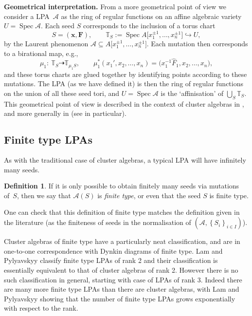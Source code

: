 \documentclass[pdftex]{sigma}
\numberwithin{equation}{section}
\theoremstyle{definition}
\newtheorem{defn}[thm]{Definition}
\newcommand{\TT}{\mathbb{T}}
\DeclareMathOperator{\Spec}{Spec}
\begin{document}
{\bf Geometrical interpretation.}
From a more geometrical point of view we consider a LPA~$\mathcal A$ as the ring of regular functions on an affine algebraic variety $U = \Spec \mathcal A$. Each seed $S$ corresponds to the inclusion of a torus chart
\[ S= (\bm x, \bm F), \qquad \TT_S:= \Spec A\big[x_1^{\pm1},\ldots,x_n^{\pm1}\big] \hookrightarrow U, \]
by the Laurent phenomenon $\mathcal A\subseteq A\big[x_1^{\pm1},\ldots,x_n^{\pm1}\big]$. Each mutation then corresponds to a birational map, e.g.,
\[ \mu_1\colon\ \TT_S\dashrightarrow \TT_{\mu_1S}, \qquad \mu_1^*(x_1',x_2,\ldots,x_n) = \big(x_1^{-1}\hat{F}_1,x_2,\ldots,x_n\big), \]
and these torus charts are glued together by identifying points according to these mutations. The LPA (as we have defined it) is then the ring of regular functions on the union of all these seed tori, and $U=\Spec \mathcal A$ is the `affinisation' of $\bigcup_S\TT_S$. This geometrical point of view is described in the context of cluster algebras in \cite[Section~3]{ghk}, and more generally in \cite[Section~2.2]{duc} (see \cite[Remark~2.7]{duc} in particular).

\subsection{Finite type LPAs}
As with the traditional case of cluster algebras, a typical LPA will have infinitely many seeds.

\begin{defn}
If it is only possible to obtain finitely many seeds via mutations of~$S$, then we say that $\mathcal{A}(S)$ is \textit{finite type}, or even that the seed $S$ is finite type.
\end{defn}

One can check that this definition of finite type matches the definition given in the literature (as the finiteness of seeds in the normalisation of $\left(\mathcal{A}, \left\{S_i\right\}_{i\in I} \right)$).

Cluster algebras of finite type have a particularly neat classification, and are in one-to-one correspondence with Dynkin diagrams of finite type. Lam and Pylyavskyy \cite[Theorem~6.6]{lp} classify finite type LPAs of rank 2 and their classification is essentially equivalent to that of cluster algebras of rank 2. However there is no such classification in general, starting with case of LPAs of rank 3. Indeed there are many more finite type LPAs than there are cluster algebras, with Lam and Pylyavskyy showing that the number of finite type LPAs grows exponentially with respect to the rank.
\end{document}
